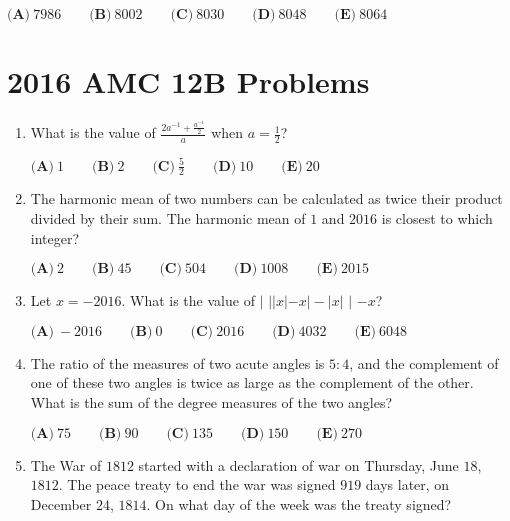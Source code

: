 \documentclass{article}
\begin{document}
\begin{enumerate}[label=\arabic*., itemsep=0.5em]
\(\textbf{(A)}\ 7986\qquad\textbf{(B)}\ 8002\qquad\textbf{(C)}\ 8030\qquad\textbf{(D)}\ 8048\qquad\textbf{(E)}\ 8064\)\par \vspace{0.5em}
\end{enumerate}
\newpage\section*{2016 AMC 12B Problems}

\begin{enumerate}[label=\arabic*., itemsep=0.5em]
\item What is the value of \(\frac{2a^{-1}+\frac{a^{-1}}{2}}{a}\) when \(a= \frac{1}{2}\)?

\(\textbf{(A)}\ 1\qquad\textbf{(B)}\ 2\qquad\textbf{(C)}\ \frac{5}{2}\qquad\textbf{(D)}\ 10\qquad\textbf{(E)}\ 20\)\par \vspace{0.5em}\item The harmonic mean of two numbers can be calculated as twice their product divided by their sum. The harmonic mean of \(1\) and \(2016\) is closest to which integer?

\(\textbf{(A)}\ 2 \qquad
\textbf{(B)}\ 45 \qquad
\textbf{(C)}\ 504 \qquad
\textbf{(D)}\ 1008 \qquad
\textbf{(E)}\ 2015 \)\par \vspace{0.5em}\item Let \(x=-2016\). What is the value of \(\bigg|\) \(||x|-x|-|x|\) \(\bigg|\) \(-x\)?

\(\textbf{(A)}\ -2016\qquad\textbf{(B)}\ 0\qquad\textbf{(C)}\ 2016\qquad\textbf{(D)}\ 4032\qquad\textbf{(E)}\ 6048\)\par \vspace{0.5em}\item The ratio of the measures of two acute angles is \(5:4\), and the complement of one of these two angles is twice as large as the complement of the other. What is the sum of the degree measures of the two angles?

\(\textbf{(A)}\ 75\qquad\textbf{(B)}\ 90\qquad\textbf{(C)}\ 135\qquad\textbf{(D)}\ 150\qquad\textbf{(E)}\ 270\)\par \vspace{0.5em}\item The War of \(1812\) started with a declaration of war on Thursday, June \(18\), \(1812\). The peace treaty to end the war was signed \(919\) days later, on December \(24\), \(1814\). On what day of the week was the treaty signed? 


\end{enumerate}
\end{document}
